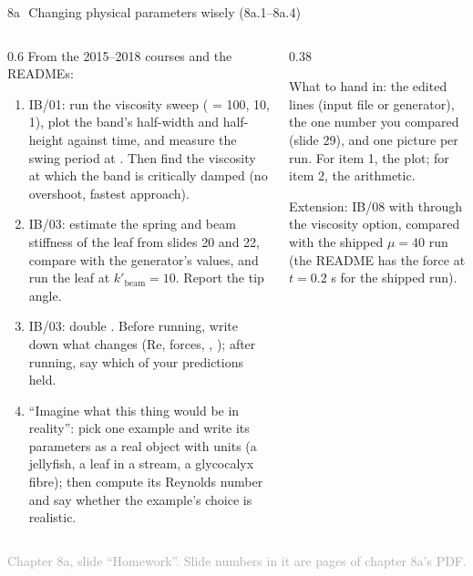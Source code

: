 \documentclass[aspectratio=169,11pt]{beamer}
\newcommand{\sourcecredit}[1]{\vfill\begin{flushright}\tiny\textcolor{DarkGray}{#1}\end{flushright}}
\begin{document}
\begin{frame}{8a\,\textbullet\ Changing physical parameters wisely (8a.1--8a.4)}
\label{fr:c8ax1}
\begin{columns}[T,onlytextwidth]
\begin{column}{0.6\textwidth}
\footnotesize From the 2015--2018 courses and the READMEs:
\begin{enumerate}
  \item[8a.1] IB/01: run the viscosity sweep ( = 100, 10, 1), plot the band's half-width and half-height against time, and measure the swing period at . Then find the viscosity at which the band is critically damped (no overshoot, fastest approach).
  \item[8a.2] IB/03: estimate the spring and beam stiffness of the leaf from slides 20 and 22, compare with the generator's values, and run the leaf at $k'_{\mathrm{beam}} = 10$. Report the tip angle.
  \item[8a.3] IB/03: double . Before running, write down what changes (Re, forces, , ); after running, say which of your predictions held.
  \item[8a.4] ``Imagine what this thing would be in reality'': pick one example and write its parameters as a real object with units (a jellyfish, a leaf in a stream, a glycocalyx fibre); then compute its Reynolds number and say whether the example's choice is realistic.
\end{enumerate}
\end{column}
\begin{column}{0.38\textwidth}
\begin{punchbox}
\footnotesize What to hand in: the edited lines (input file or generator), the one number you compared (slide 29), and one picture per run. For item 1, the plot; for item 2, the arithmetic.
\end{punchbox}
\vspace{1mm}
\footnotesize {} Extension: IB/08 with  through the viscosity option, compared with the shipped $\mu = 40$ run (the README has the force at $t = 0.2$ s for the shipped run).
\end{column}
\end{columns}
\sourcecredit{Chapter 8a, slide ``Homework''. Slide numbers in it are pages of chapter 8a's PDF.}
\end{frame}
\end{document}
